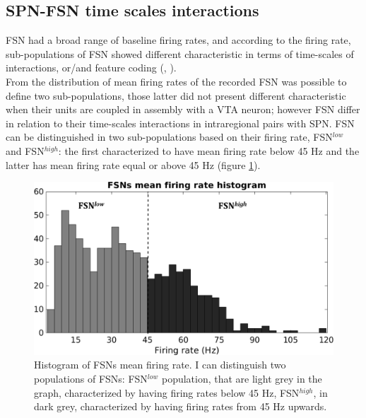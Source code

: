 \subsection{SPN-FSN time scales interactions}
\label{sec:SPN-FSN_Bin}
FSN had a broad range of baseline firing rates, and according to the firing rate, sub-populations of FSN showed different characteristic in terms of time-scales of interactions, or/and feature coding (\cite{Heimer1997}, \cite{Tachibana2012}).\\From the distribution of mean firing rates of the recorded FSN was possible to define two sub-populations, those latter did not present different characteristic when their units are coupled in assembly with a VTA neuron; however FSN differ in relation to their time-scales interactions in intraregional pairs with SPN. FSN can be distinguished in two sub-populations based on their firing rate, FSN$^{low}$ and FSN$^{high}$: the first characterized to have mean firing rate below 45 Hz and the latter has mean firing rate equal or above 45 Hz (figure \ref{fig:FSNsFireHisto}).\\
\begin{figure}
    \centering
    \includegraphics[scale=0.6]{figures/FSNFiringRateLightDark.pdf}
    \caption{Histogram of FSNs mean firing rate. I can distinguish two populations of FSNs: FSN$^{low}$ population, that are light grey in the graph, characterized by having firing rates below 45 Hz, FSN$^{high}$, in dark grey, characterized by having firing rates from 45 Hz upwards.}
    \label{fig:FSNsFireHisto}
\end{figure}
